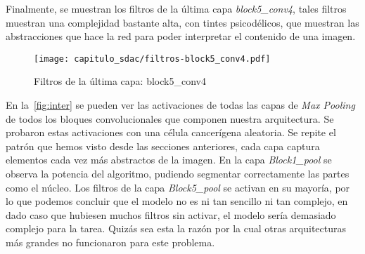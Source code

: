 Finalmente, se muestran los filtros de la última capa \emph{block5\_conv4},
tales filtros muestran una complejidad bastante alta, con tintes
psicodélicos, que muestran las abstracciones que hace la red para poder
interpretar el contenido de una imagen.

\begin{figure}[H] 
  \centering
  \texttt{[image: capitulo\_sdac/filtros-block5\_conv4.pdf]}
  \caption{Filtros de la última capa: block5\_conv4}\label{fig:convultima}
\end{figure}

En la~\autoref{fig:inter} se pueden ver las activaciones de todas las capas de
\emph{Max Pooling} de todos los bloques convolucionales que componen nuestra
arquitectura. Se probaron estas activaciones con una célula cancerígena
aleatoria. Se repite el patrón que hemos visto desde las secciones anteriores,
cada capa captura elementos cada vez más abstractos de la imagen. En la capa
\emph{Block1\_pool} se observa la potencia del algoritmo, pudiendo segmentar
correctamente las partes como el núcleo. Los filtros de la capa
\emph{Block5\_pool} se activan en su mayoría, por lo que podemos concluir que el
modelo no es ni tan sencillo ni tan complejo, en dado caso que hubiesen muchos
filtros sin activar, el modelo sería demasiado complejo para la tarea. Quizás
sea esta la razón por la cual otras arquitecturas más grandes no funcionaron
para este problema.

